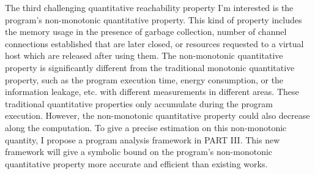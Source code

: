 {
    The third challenging quantitative reachability property I'm interested is the program's {non-monotonic} quantitative property.
    This kind of property includes the memory usage in the presence of garbage collection,
number of channel connections established that are later closed,
or resources requested to a virtual host which are released after using them. 
The non-monotonic quantitative property is significantly different from the traditional monotonic quantitative property,
such as the program execution time, energy consumption,
or the information leakage, etc. with different measurements in different areas.
These traditional quantitative properties only accumulate during the program execution. 
However, the non-monotonic quantitative property could also decrease along the computation.
To give a precise estimation on this {non-monotonic}  quantity, I propose a program analysis framework in PART III.
This new framework will give
a symbolic bound on the program's non-monotonic quantitative property more accurate and efficient
than existing works.
}
%
